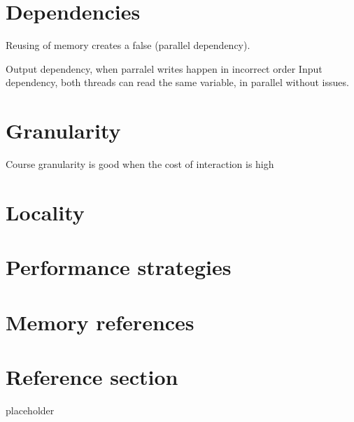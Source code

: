 \documentclass{article}
\begin{document}
\tableofcontents

\newpage

\section{Dependencies}

\begin{flushleft}
Reusing of memory creates a false (parallel dependency).

Output dependency, when parralel writes happen in incorrect order
Input dependency, both threads can read the same variable, in parallel without issues.
\end{flushleft}

\section{Granularity}
\begin{flushleft}
Course granularity is good when the cost of interaction is high
\end{flushleft}

\section{Locality}
\begin{flushleft}

\end{flushleft}

\section{Performance strategies}

\section{Memory references}

\pagebreak
\section*{Reference section} \label{sec:reference}
\begin{description}
	\item[placeholder] \hfill \\
\end{description}
\end{document}
